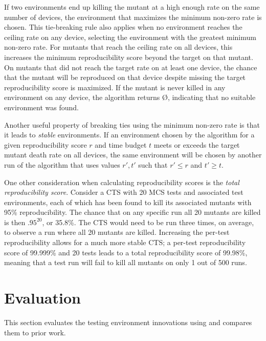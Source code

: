 If two environments end up killing the mutant at a high enough rate on the same number of devices, the environment that maximizes the minimum non-zero rate is chosen. This tie-breaking rule also applies when no environment reaches the ceiling rate on any device, selecting the environment with the greatest minimum non-zero rate. For mutants that reach the ceiling rate on all devices, this increases the minimum reproducibility score beyond the target on that mutant. On mutants that did not reach the target rate on at least one device, the chance that the mutant will be reproduced on that device despite missing the target reproducibility score is maximized. If the mutant is never killed in any environment on any device, the algorithm returns \O, indicating that no suitable environment was found.

Another useful property of breaking ties using the minimum non-zero rate is that it leads to \textit{stable} environments. If an environment chosen by the algorithm for a given reproducibility score $r$ and time budget $t$ meets or exceeds the target mutant death rate on all devices, the same environment will be chosen by another run of the algorithm that uses values $r', t'$ such that $r' \leq r$ and $t' \geq t$.

One other consideration when calculating reproducibility scores is the \textit{total reproducibility score}. Consider a CTS with 20 MCS tests and associated test environments, each of which has been found to kill its associated mutants with 95\% reproducibility. The chance that on any specific run all 20 mutants are killed is then $.95^{20}$, or 35.8\%.  The CTS would need to be run three times, on average, to observe a run where all 20 mutants are killed. Increasing the per-test reproducibility allows for a much more stable CTS; a per-test reproducibility score of 99.999\% and 20 tests leads to a total reproducibility score of 99.98\%, meaning that a test run will fail to kill all mutants on only 1 out of 500 runs.

\section{Evaluation}
\label{sec:mc-mutants-evaluation}
This section evaluates the testing environment innovations using \sys and compares them to prior work.

